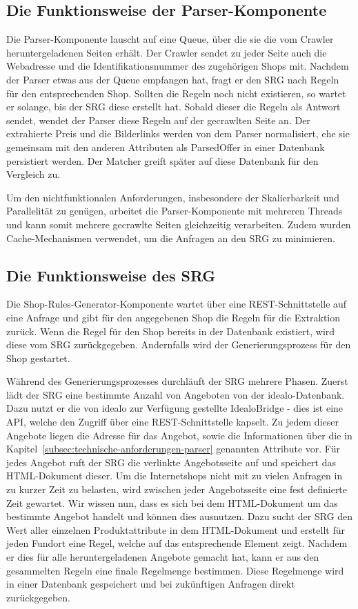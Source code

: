 \subsection{Die Funktionsweise der Parser-Komponente}
\label{subsec:funktionsweise-parser}

Die Parser-Komponente lauscht auf eine Queue, über die sie die vom Crawler heruntergeladenen Seiten erhält.
Der Crawler sendet zu jeder Seite auch die Webadresse und die Identifikationsnummer des zugehörigen Shops mit.
Nachdem der Parser etwas aus der Queue empfangen hat, fragt er den SRG nach Regeln für den entsprechenden Shop.
Sollten die Regeln noch nicht existieren, so wartet er solange, bis der SRG diese erstellt hat.
Sobald dieser die Regeln als Antwort sendet, wendet der Parser diese Regeln auf der gecrawlten Seite an.
Der extrahierte Preis und die Bilderlinks werden von dem Parser normalisiert, ehe sie gemeinsam mit den anderen
Attributen als ParsedOffer in einer Datenbank persistiert werden.
Der Matcher greift später auf diese Datenbank für den Vergleich zu.

Um den nichtfunktionalen Anforderungen, insbesondere der Skalierbarkeit und Parallelität zu genügen, arbeitet die
Parser-Komponente mit mehreren Threads und kann somit mehrere gecrawlte Seiten gleichzeitig verarbeiten.
Zudem wurden Cache-Mechanismen verwendet, um die Anfragen an den SRG zu minimieren.


\subsection{Die Funktionsweise des SRG}
\label{subsec:funktionsweise-srg}

Die Shop-Rules-Generator-Komponente wartet über eine REST-Schnittstelle auf eine Anfrage und gibt für den angegebenen
Shop die Regeln für die Extraktion zurück.
Wenn die Regel für den Shop bereits in der Datenbank existiert, wird diese vom SRG zurückgegeben.
Andernfalls wird der Generierungsprozess für den Shop gestartet.

Während des Generierungsprozesses durchläuft der SRG mehrere Phasen.
Zuerst lädt der SRG eine bestimmte Anzahl von Angeboten von der idealo-Datenbank.
Dazu nutzt er die von idealo zur Verfügung gestellte IdealoBridge - dies ist eine API, welche den Zugriff über
eine REST-Schnittstelle kapselt.
Zu jedem dieser Angebote liegen die Adresse für das Angebot, sowie die  Informationen über die in
Kapitel~\ref{subsec:technische-anforderungen-parser} genannten Attribute vor.
Für jedes Angebot ruft der SRG die verlinkte Angebotsseite auf und speichert das HTML-Dokument dieser.
Um die Internetshops nicht mit zu vielen Anfragen in zu kurzer Zeit zu belasten, wird zwischen jeder Angebotsseite
eine fest definierte Zeit gewartet.
Wir wissen nun, dass es sich bei dem HTML-Dokument um das bestimmte Angebot handelt und können dies ausnutzen.
Dazu sucht der SRG den Wert aller einzelnen Produktattribute in dem HTML-Dokument und erstellt für jeden Fundort eine
Regel, welche auf das entsprechende Element zeigt.
Nachdem er dies für alle heruntergeladenen Angebote gemacht hat, kann er aus den gesammelten Regeln eine
finale Regelmenge bestimmen.
Diese Regelmenge wird in einer Datenbank gespeichert und bei zukünftigen Anfragen direkt zurückgegeben.

